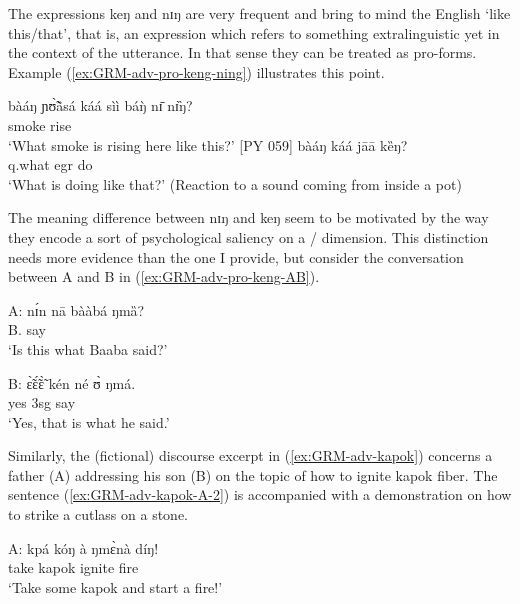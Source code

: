 \begin{exe}
\begin{exe}
\begin{exe}
\begin{exe}
\begin{exe}
\begin{exe}
\begin{exe}
\begin{exe}
\begin{exe}
\begin{exe}
\begin{exe}
\begin{exe}
\z 
 \z   

The expressions  {\sls keŋ} and {\sls nɪŋ} are very frequent  and bring to mind the  English  `like this/that',  that is,  an expression which refers to something extralinguistic yet in  the context of the utterance. In that sense they can be treated as  pro-forms. Example (\ref{ex:GRM-adv-pro-keng-ning}) illustrates this point.

\ea\label{ex:GRM-adv-pro-keng-ning}

 \ea\label{ex:GRM-adv-pro-ning}
\gll bàáŋ ɲʊ̃̀ã̀sá káá sìì báŋ̀ nɪ̄ nɪ̏ŋ?\\
{\q}  smoke  {\egr} rise {\dem} {\postp} {\dxm}\\
\glt `What smoke is rising here like this?'  [PY 059]
  \ex\label{ex:GRM-adv-pro-keng}
 \gll bàáŋ káá jāā kȅŋ?\\
  {\sc q}.what {\sc egr} do  {\dxm}\\
 \glt `What is doing like that?' (Reaction to a sound coming from inside a pot)

\z 
 \z   

The meaning difference between   {\sls nɪŋ}  and {\sls 
keŋ} seem to be 
motivated by the way they  encode a sort of psychological saliency on a
/ dimension. This distinction needs more evidence than the one I
provide,  but consider the conversation between A and B in
(\ref{ex:GRM-adv-pro-keng-AB}). 


\ea\label{ex:GRM-adv-pro-keng-AB}

 \ea\label{ex:GRM-adv-pro-A}
\gll A: nɪ́n nā bààbá ŋmȁ?\\
 {} {\dxm} {\foc} B. say\\
\glt `Is this what Baaba said?'

  \ex\label{ex:GRM-adv-pro-B}
 \gll B: ɛ̃̀ɛ̃́ɛ̃̀ kén{\ꜜ} né ʊ̀ ŋmá.\\
 {} yes {\dxm} {\foc} {\sc 3sg} say\\
\glt `Yes, that is what he said.'
 
 
\z 
 \z   

Similarly,  the (fictional) discourse excerpt in
(\ref{ex:GRM-adv-kapok}) concerns a father (A) addressing his son (B) on the
topic of  how to ignite kapok fiber. The sentence (\ref{ex:GRM-adv-kapok-A-2})
is accompanied with a demonstration on how to strike a cutlass on a stone.


\ea\label{ex:GRM-adv-kapok}
 
 
 \ea\label{ex:GRM-adv-kapok-A-1}
\gll A: kpá kóŋ à ŋmɛ̀nà díŋ!\\
{}  take kapok {\conn} ignite fire\\
\glt `Take some kapok and start a fire!'


\end{exe}
\end{exe}
\end{exe}
\end{exe}
\end{exe}
\end{exe}
\end{exe}
\end{exe}
\end{exe}
\end{exe}
\end{exe}
\end{exe}
